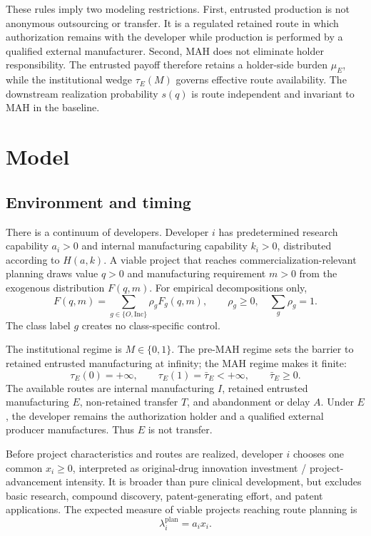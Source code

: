 \documentclass[12pt]{article}
\newcommand{\1}{\mathbf{1}}
\begin{document}
These rules imply two modeling restrictions. First, entrusted production is
not anonymous outsourcing or transfer. It is a regulated retained route in
which authorization remains with the developer while production is performed
by a qualified external manufacturer. Second, MAH does not eliminate holder
responsibility. The entrusted payoff therefore retains a holder-side burden
\(\mu_E\), while the institutional wedge \(\tau_E(M)\) governs effective
route availability. The downstream realization probability \(s(q)\) is
route independent and invariant to MAH in the baseline.

\section{Model}
\label{sec:p16m-model}

\subsection{Environment and timing}
\label{subsec:p16m-environment}

There is a continuum of developers. Developer \(i\) has predetermined
research capability \(a_i>0\) and internal manufacturing capability
\(k_i>0\), distributed according to \(H(a,k)\). A viable project that reaches
commercialization-relevant planning draws value \(q>0\) and manufacturing
requirement \(m>0\) from the exogenous distribution \(F(q,m)\). For empirical
decompositions only,
\[
  F(q,m)=\sum_{g\in\{O,\mathrm{Inc}\}}\rho_gF_g(q,m),
  \qquad
  \rho_g\geq0,\quad \sum_g\rho_g=1.
\]
The class label \(g\) creates no class-specific control.

The institutional regime is \(M\in\{0,1\}\). The pre-MAH regime sets the
barrier to retained entrusted manufacturing at infinity; the MAH regime
makes it finite:
\begin{equation}
  \tau_E(0)=+\infty,
  \qquad
  \tau_E(1)=\bar\tau_E<+\infty,
  \qquad \bar\tau_E\geq0.
  \label{eq:p16m-policy}
\end{equation}
The available routes are internal manufacturing \(I\), retained entrusted
manufacturing \(E\), non-retained transfer \(T\), and abandonment or delay
\(A\). Under \(E\), the developer remains the authorization holder and a
qualified external producer manufactures. Thus \(E\) is not transfer.

Before project characteristics and routes are realized, developer \(i\)
chooses one common \(x_i\geq0\), interpreted as original-drug innovation
investment / project-advancement intensity. It is broader than pure clinical
development, but excludes basic research, compound discovery,
patent-generating effort, and patent applications. The expected measure of
viable projects reaching route planning is
\begin{equation}
  \lambda_i^{\mathrm{plan}}=a_ix_i.
  \label{eq:p16m-planning}
\end{equation}
\end{document}
